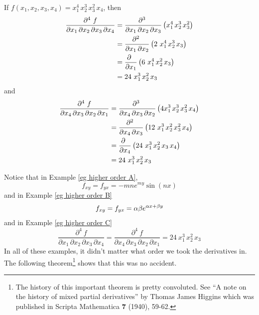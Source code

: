 \goodbreak
\begin{eg}\label{eg higher order C}
If $f(x_1,x_2,x_3,x_4) = x_1^4\, x_2^3\, x_3^2\, x_4$, then
\begin{align*}
\frac{\partial^4\  f}
          {\partial x_1\, \partial x_2\,\partial x_3\,\partial x_4} 
   &=  \frac{\partial^3 \ }
          {\partial x_1\, \partial x_2\,\partial x_3}
                         \left( x_1^4\, x_2^3\, x_3^2\right)  \\
   &=  \frac{\partial^2 \ }
          {\partial x_1\, \partial x_2}
                         \left( 2\ x_1^4\, x_2^3\, x_3\right)  \\
   &=  \pdiff{}{x_1}
                         \left( 6\ x_1^4\, x_2^2\, x_3\right)  \\
   &=   24\ x_1^3\, x_2^2\, x_3
\end{align*}
and
\begin{align*}
\frac{\partial^4\ f}
          {\partial x_4\, \partial x_3\,\partial x_2\,\partial x_1} 
   &=  \frac{\partial^3 \ }
          {\partial x_4\, \partial x_3\,\partial x_2}
                         \left( 4 x_1^3\, x_2^3\, x_3^2\,x_4\right)  \\
   &=  \frac{\partial^2 \ }
          {\partial x_4\, \partial x_3}
                         \left( 12\ x_1^3\, x_2^2\, x_3^2\,x_4\right)  \\
   &=  \pdiff{}{x_4}
                         \left( 24\ x_1^3\, x_2^2\, x_3\,x_4\right)  \\
   &=   24\ x_1^3\, x_2^2\, x_3
\end{align*}
\end{eg}
Notice that in Example \ref{eg higher order A},
\begin{equation*}
f_{xy}= f_{yx} = -m n e^{my}\sin(nx)
\end{equation*}
and in Example \ref{eg higher order B}
\begin{equation*}
f_{xy}= f_{yx} = \alpha \beta  e^{\alpha x+\beta y} 
\end{equation*}
and in Example \ref{eg higher order C}
\begin{equation*}
\frac{\partial^4\  f}
          {\partial x_1\, \partial x_2\,\partial x_3\,\partial x_4}
= \frac{\partial^4\ f}
          {\partial x_4\, \partial x_3\,\partial x_2\,\partial x_1}  
= 24\ x_1^3\, x_2^2\, x_3
\end{equation*}
In all of these examples, it didn't matter what order we took the derivatives
in. The following theorem\footnote{The history of this important theorem is pretty convoluted. See 
``A note on the history of mixed partial derivatives''
by Thomas James Higgins which was published in 
Scripta Mathematica \textbf{7} (1940), 59-62. } shows that this was no accident.



